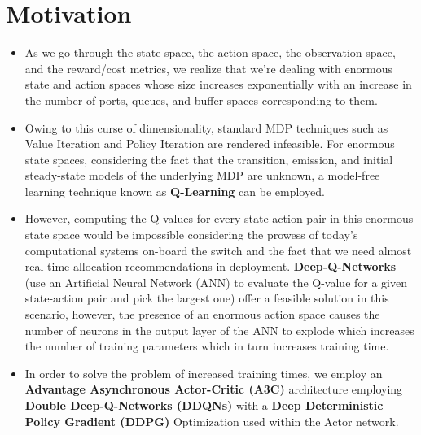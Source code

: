 \documentclass{article}
\begin{document}
\section{Motivation}
\begin{itemize}
    \item As we go through the state space, the action space, the observation space, and the reward/cost metrics, we realize that we're dealing with enormous state and action spaces whose size increases exponentially with an increase in the number of ports, queues, and buffer spaces corresponding to them.
    \item Owing to this curse of dimensionality, standard MDP techniques such as Value Iteration and Policy Iteration are rendered infeasible. For enormous state spaces, considering the fact that the transition, emission, and initial steady-state models of the underlying MDP are unknown, a model-free learning technique known as \textbf{Q-Learning} can be employed.
    \item However, computing the Q-values for every state-action pair in this enormous state space would be impossible considering the prowess of today's computational systems on-board the switch and the fact that we need almost real-time allocation recommendations in deployment. \textbf{Deep-Q-Networks} (use an Artificial Neural Network (ANN) to evaluate the Q-value for a given state-action pair and pick the largest one) offer a feasible solution in this scenario, however, the presence of an enormous action space causes the number of neurons in the output layer of the ANN to explode which increases the number of training parameters which in turn increases training time.
    \item In order to solve the problem of increased training times, we employ an \textbf{Advantage Asynchronous Actor-Critic (A3C)} architecture employing \textbf{Double Deep-Q-Networks (DDQNs)} with a \textbf{Deep Deterministic Policy Gradient (DDPG)} Optimization used within the Actor network.
\end{itemize}
\end{document}
